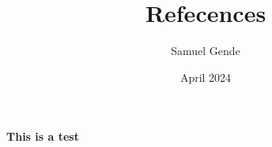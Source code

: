 \documentclass{article}
\title{Refecences}
\author{Samuel Gende }
\date{April 2024}
\begin{document}
\maketitle

\paragraph{This is a test\cite{Martin:2018}}



\end{document}
